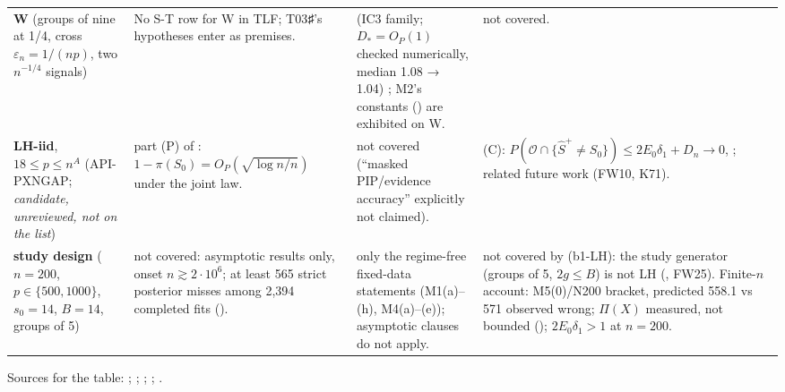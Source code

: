 {\begin{xltabular}{\linewidth}{@{}p{2.6cm}XXX@{}}
\textbf{W} (groups of nine at 1/4, cross $\varepsilon_n=1/(np)$, two $n^{-1/4}$ signals) & No S-T row for W in TLF; T03♯'s hypotheses enter  as premises. &  (IC3 family; $D_{*}=O_P(1)$ checked numerically, median 1.08 → 1.04) ; M2's constants () are exhibited on W. & not covered. \\
\textbf{LH-iid}, $18\le p\le n^A$ (API-PXNGAP; \emph{candidate, unreviewed, not on the list}) & part (P) of : $1-\pi(S_0)=O_P(\sqrt{\log n/n})$ under the joint law. & not covered (``masked PIP/evidence accuracy'' explicitly not claimed). &  (C): $P(\mathcal{O}\cap\{\hat{S}^{+}\ne S_0\})\le2E_0\delta_1+D_n\to0$, ; related future work  (FW10, K71). \\
\textbf{study design} ($n=200$, $p\in\{500,1000\}$, $s_0=14$, $B=14$, groups of 5) & not covered: asymptotic results only, onset $n\gtrsim2\cdot10^{6}$; at least 565 strict posterior misses among 2,394 completed fits (). & only the regime-free fixed-data statements (M1(a)–(h), M4(a)–(e)); asymptotic clauses do not apply. & not covered by (b1-LH): the study generator (groups of 5, $2g\le B$) is not LH (, FW25). Finite-$n$ account: M5(0)/N200 bracket, predicted 558.1 vs 571 observed wrong; $\Pi(X)$ measured, not bounded (); $2E_0\delta_1>1$ at $n=200$. \\
\bottomrule
\end{xltabular}
}
\noindent Sources for the table: ; ; ; ; .


